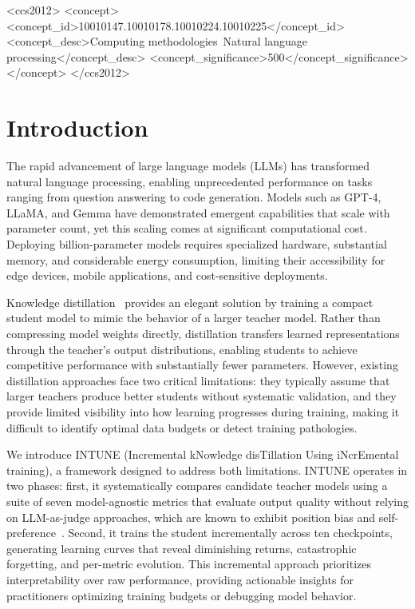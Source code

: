 \documentclass[sigconf]{acmart}
\begin{document}
\begin{CCSXML}
<ccs2012>
<concept>
<concept_id>10010147.10010178.10010224.10010225</concept_id>
<concept_desc>Computing methodologies~Natural language processing</concept_desc>
<concept_significance>500</concept_significance>
</concept>
</ccs2012>
\end{CCSXML}

\maketitle

\section{Introduction}

The rapid advancement of large language models (LLMs) has transformed natural language processing, enabling unprecedented performance on tasks ranging from question answering to code generation. Models such as GPT-4, LLaMA, and Gemma have demonstrated emergent capabilities that scale with parameter count, yet this scaling comes at significant computational cost. Deploying billion-parameter models requires specialized hardware, substantial memory, and considerable energy consumption, limiting their accessibility for edge devices, mobile applications, and cost-sensitive deployments.

Knowledge distillation~\cite{hinton2015distilling} provides an elegant solution by training a compact student model to mimic the behavior of a larger teacher model. Rather than compressing model weights directly, distillation transfers learned representations through the teacher's output distributions, enabling students to achieve competitive performance with substantially fewer parameters. However, existing distillation approaches face two critical limitations: they typically assume that larger teachers produce better students without systematic validation, and they provide limited visibility into how learning progresses during training, making it difficult to identify optimal data budgets or detect training pathologies.

We introduce INTUNE (Incremental kNowledge disTillation Using iNcrEmental training), a framework designed to address both limitations. INTUNE operates in two phases: first, it systematically compares candidate teacher models using a suite of seven model-agnostic metrics that evaluate output quality without relying on LLM-as-judge approaches, which are known to exhibit position bias and self-preference~\cite{zheng2023judging}. Second, it trains the student incrementally across ten checkpoints, generating learning curves that reveal diminishing returns, catastrophic forgetting, and per-metric evolution. This incremental approach prioritizes interpretability over raw performance, providing actionable insights for practitioners optimizing training budgets or debugging model behavior.
\end{document}
